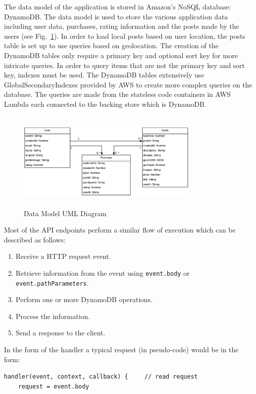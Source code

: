 \documentclass[conference]{IEEEtran}
\begin{document}
The data model of the application is stored in Amazon's NoSQL database: DynamoDB. The data model is used to store the various application data including user data, purchases, rating information and the posts made by the users (see Fig.~\ref{fig:data_model}). In order to load local posts based on user location, the posts table is set up to use queries based on geolocation. The creation of the DynamoDB tables only require a primary key and optional sort key for more intricate queries. In order to query items that are not the primary key and sort key, indexes must be used. The DynamoDB tables extensively use GlobalSecondaryIndexes provided by AWS to create more complex queries on the database. The queries are made from the stateless code containers in AWS Lambda each connected to the backing store which is DynamoDB.

\begin{figure}[htbp]
\centerline{\includegraphics[width=8.8cm,height=4.8cm,keepaspectratio]{data_model.png}}
\caption{Data Model UML Diagram}
\label{fig:data_model}
\end{figure}

Most of the API endpoints perform a similar flow of execution which can be described as follows:
\begin{enumerate}
\item Receive a HTTP request event.
\item Retrieve information from the event using \verb|event.body| or \verb|event.pathParameters|.
\item Perform one or more DynamoDB operations.
\item Process the information.
\item Send a response to the client.
\end{enumerate}
In the form of the handler a typical request (in pseudo-code) would be in the form:

\verb|handler(event, context, callback) {|
\verb|    // read request|\\
\verb|    request = event.body|
\end{document}
